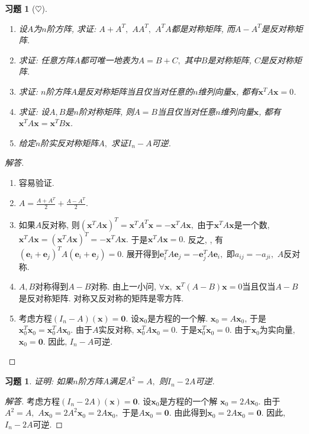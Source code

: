 \documentclass[UTF8]{ctexart}
\newcommand\bs[1]{\boldsymbol{ #1}}
\newtheorem{ex}[thm]{习题}
\begin{document}
\begin{ex}[$\heartsuit $]
\begin{enumerate}
\item 设$A$为$n$阶方阵, 求证: $A + A^T,$ $AA^T, $ $A^T A$都是对称矩阵, 而$A - A^T$是反对称矩阵.

\item 求证: 任意方阵$A$都可唯一地表为$A = B+C, $ 其中$B$是对称矩阵, $C$是反对称矩阵.

\item 求证: $n$阶方阵$A$是反对称矩阵当且仅当对任意的$n$维列向量$\bs x$, 都有$\bs x^T A \bs x = 0$.

\item 求证: 设$A,B$是$n$阶对称矩阵, 则$A = B $当且仅当对任意$n$维列向量$\bs x$, 都有$\bs x^T A \bs x = \bs x^T B \bs x$.

\item 给定$n$阶实反对称矩阵$A,$ 求证$I_n - A$可逆.
\end{enumerate}
\end{ex}
\begin{proof}[解答]
\begin{enumerate}
\item 容易验证.

\item $A = \frac{A+A^T}{2} + \frac{A-A^T}{2}.$

\item 如果$A$反对称, 则$(\bs x^T A \bs x)^T = \bs x^T A^T \bs x = -\bs x^T A \bs x,$ 由于$\bs x^T A \bs x$是一个数, $\bs x^T A \bs x = (\bs x^T A \bs x)^T = -\bs x^T A \bs x.$ 于是$\bs x^T A \bs x=0.$ 反之, , 有$(\bs e_i + \bs e_j)^T A (\bs e_i + \bs e_j) = 0.$ 展开得到$\bs e_i^T A \bs e_j = -\bs e_j^T A \bs e_i,$ 即$a_{ij} = - a_{ji},$ $A$反对称.


\item $A,B$对称得到$A-B$对称. 由上一小问, $\forall \bs x,$ $\bs x^T (A-B) \bs x = 0$当且仅当$A-B$是反对称矩阵. 对称又反对称的矩阵是零方阵.

\item 考虑方程$(I_n - A)(\bs x) = \bs 0.$ 设$\bs x_0$是方程的一个解. $\bs x_0 = A \bs x_0$, 于是$\bs x_0^T \bs x_0 = \bs x_0^T A \bs x_0.$ 由于$A$实反对称, $\bs x_0^T A \bs x_0 = 0.$ 于是$\bs x_0^T \bs x_0 =  0.$ 由于$\bs x_0$为实向量, $\bs x_0 = \bs 0.$ 因此, $I_n - A$可逆.
\end{enumerate}
\end{proof}

\begin{ex}
证明: 如果$n$阶方阵$A$满足$A^2 = A,$ 则$I_n-2A$可逆.
\end{ex}
\begin{proof}[解答]
考虑方程$(I_n - 2A)(\bs x) = \bs 0.$ 设$\bs x_0$是方程的一个解 $\bs x_0 = 2A \bs x_0.$ 由于$A^2 = A,$ $A \bs x_0 = 2A^2 \bs x_0 = 2A\bs x_0,$ 于是$A \bs x_0 = \bs 0.$ 由此得到$\bs x_0 = 2 A \bs x_0 = \bs 0.$ 因此, $I_n - 2A$可逆.
\end{proof}
\end{document}
